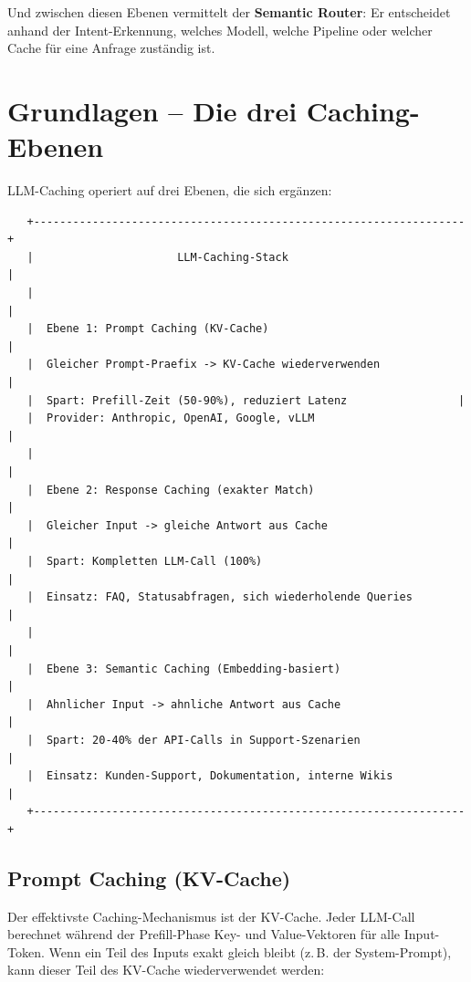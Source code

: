 Und zwischen diesen Ebenen vermittelt der \textbf{Semantic Router}: Er entscheidet anhand der Intent-Erkennung, welches Modell, welche Pipeline oder welcher Cache für eine Anfrage zuständig ist.

\section{Grundlagen -- Die drei Caching-Ebenen}

LLM-Caching operiert auf drei Ebenen, die sich ergänzen:

\begin{verbatim}
   +------------------------------------------------------------------+
   |                      LLM-Caching-Stack                            |
   |                                                                   |
   |  Ebene 1: Prompt Caching (KV-Cache)                              |
   |  Gleicher Prompt-Praefix -> KV-Cache wiederverwenden             |
   |  Spart: Prefill-Zeit (50-90%), reduziert Latenz                 |
   |  Provider: Anthropic, OpenAI, Google, vLLM                       |
   |                                                                   |
   |  Ebene 2: Response Caching (exakter Match)                       |
   |  Gleicher Input -> gleiche Antwort aus Cache                     |
   |  Spart: Kompletten LLM-Call (100%)                               |
   |  Einsatz: FAQ, Statusabfragen, sich wiederholende Queries        |
   |                                                                   |
   |  Ebene 3: Semantic Caching (Embedding-basiert)                   |
   |  Ahnlicher Input -> ahnliche Antwort aus Cache                   |
   |  Spart: 20-40% der API-Calls in Support-Szenarien                |
   |  Einsatz: Kunden-Support, Dokumentation, interne Wikis           |
   +------------------------------------------------------------------+
\end{verbatim}

\subsection{Prompt Caching (KV-Cache)}

Der effektivste Caching-Mechanismus ist der KV-Cache. Jeder LLM-Call berechnet während der Prefill-Phase Key- und Value-Vektoren für alle Input-Token. Wenn ein Teil des Inputs exakt gleich bleibt (z.\,B. der System-Prompt), kann dieser Teil des KV-Cache wiederverwendet werden:

